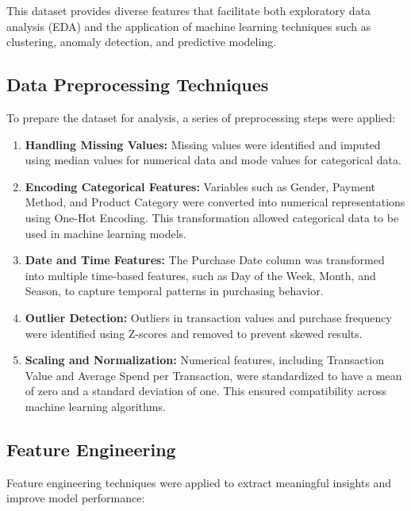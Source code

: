 \documentclass[12pt, a4paper,twoside]{report}
\theoremstyle{plain} %
\theoremstyle{definition} %
\theoremstyle{remark} %
\numberwithin{equation}{chapter}
\begin{document}
This dataset provides diverse features that facilitate both exploratory data analysis (EDA) and the application of machine learning techniques such as clustering, anomaly detection, and predictive modeling.

\subsection{Data Preprocessing Techniques}

To prepare the dataset for analysis, a series of preprocessing steps were applied:

\begin{enumerate}
\item \textbf{Handling Missing Values:} Missing values were identified and imputed using median values for numerical data and mode values for categorical data.
\item \textbf{Encoding Categorical Features:} Variables such as Gender, Payment Method, and Product Category were converted into numerical representations using One-Hot Encoding. This transformation allowed categorical data to be used in machine learning models.
\item \textbf{Date and Time Features:} The Purchase Date column was transformed into multiple time-based features, such as Day of the Week, Month, and Season, to capture temporal patterns in purchasing behavior.
\item \textbf{Outlier Detection:} Outliers in transaction values and purchase frequency were identified using Z-scores and removed to prevent skewed results.
\item \textbf{Scaling and Normalization:} Numerical features, including Transaction Value and Average Spend per Transaction, were standardized to have a mean of zero and a standard deviation of one. This ensured compatibility across machine learning algorithms.
\end{enumerate}

\subsection{Feature Engineering}
Feature engineering techniques were applied to extract meaningful insights and improve model performance:
\end{document}
